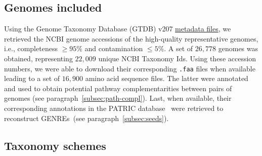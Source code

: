\documentclass[sn-mathphys,Numbered]{sn-jnl}  %
\theoremstyle{thmstyleone}%
\theoremstyle{thmstyletwo}%
\theoremstyle{thmstylethree}%
\begin{document}
    \subsection*{Genomes included}
    \label{subsec:genomes}

        Using the Genome Taxonomy Database (GTDB) v207 \href{https://data.gtdb.ecogenomic.org/releases/release207/207.0/}{metadata files}, we retrieved the NCBI genome accessions of the high-quality representative genomes, i.e., completeness $\geq 95\%$  and contamination $\leq 5\%$.
        A set of $26,778$ genomes was obtained, representing $22,009$ unique NCBI Taxonomy Ids.
        Using these accession numbers, we were able to download their corresponding \texttt{.faa} files when available 
        leading to a set of $16,900$ amino acid sequence files.
        The latter were annotated and used to obtain potential pathway complementarities between pairs of genomes (see paragraph~\ref{subsec:path-compl}).
        Last, when available, their corresponding annotations in the PATRIC database~\cite{wattam2017improvements} were retrieved to reconstruct GENREs~(see paragraph~\ref{subsec:seeds}).


    \subsection*{Taxonomy schemes}
    \label{subsec:taxonomies}
\end{document}
